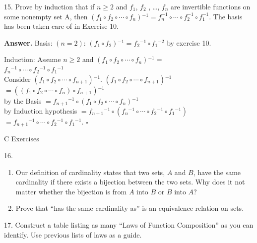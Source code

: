 \documentclass[10pt,]{book}
\theoremstyle{plain}
\theoremstyle{definition}
\theoremstyle{definition}
\theoremstyle{definition}
\begin{document}
\begin{exercisegroup}
\par\smallskip
\item[15.]\hypertarget{exercise-37}{} Prove by induction that if \(n\geq  2\) and \(f_1\), \(f_2\) , \ldots  , \(f_n\) are invertible functions on some nonempty set A, then {
}\(\left( f_1\circ  f_2\circ  \cdots  \circ  f_n \right){}^{-1}= f_n^{-1}\circ \cdots \circ f_2^{-1}\circ f_1^{-1}\). The basis has been taken
care of in Exercise 10.%
\par\smallskip
\par\smallskip
\noindent\textbf{Answer.}\hypertarget{answer-16}{}\quad
Basis: \((n=2)\): \(\left(f_1\circ f_2\right){}^{-1}=f_2{}^{-1}\circ f_1{}^{-2}\) by exercise 10. %
\par
Induction: Assume \(n\geq 2\) and \(\left(f_1\circ f_2\circ \cdots \circ f_n\right){}^{-1}=\)\\
 \(f_n{}^{-1}\circ \cdots \circ f_2{}^{-1}\circ f_1{}^{-1}\)\\
 Consider \(\left(f_1\circ f_2\circ \cdots \circ f_{n+1}\right){}^{-1}\).
  \(\left(f_1\circ f_2\circ \cdots \circ f_{n+1}\right){}^{-1}\) \(=\left(\left(f_1\circ f_2\circ \cdots \circ f_n\right)\circ f_{n+1}\right){}^{-1}\)\\
  by the Basis   \(=f_{n+1}{}^{-1}\circ \left(f_1\circ f_2\circ \cdots \circ f_n\right){}^{-1}\)\\
  by Induction hypothesis  \(=f_{n+1}{}^{-1}\circ \left(f_n{}^{-1}\circ \cdots \circ f_2{}^{-1}\circ f_1{}^{-1}\right)\)\\
 \(=f_{n+1}{}^{-1}\circ \cdots \circ f_2{}^{-1}\circ f_1{}^{-1}\). \(\square\)
\end{exercisegroup}
\par\smallskip\noindent
\hypertarget{exercisegroup-7}{}\typeout{************************************************}
\typeout{************************************************}
C Exercises%
\begin{exercisegroup}
\item[16.]\hypertarget{exercise-38}{}\leavevmode%
\begin{enumerate}[label=\alph*]
\item\hypertarget{li-101}{} Our definition of cardinality states that two sets, \(A\) and \(B\), have the same cardinality if there exists a bijection
between the two sets. Why does it not matter whether the bijection is from \(A\) into \(B\) or \(B\) into \(A\)?%
\item\hypertarget{li-102}{}Prove that ``has the same cardinality as'' is an equivalence relation on sets.%
\end{enumerate}
%
\par\smallskip
\item[17.]\hypertarget{exercise-39}{}Construct a table listing as many ``Laws of Function Composition'' as you can identify. Use previous lists of laws as a guide.%
\par\smallskip
\end{exercisegroup}
\end{document}
